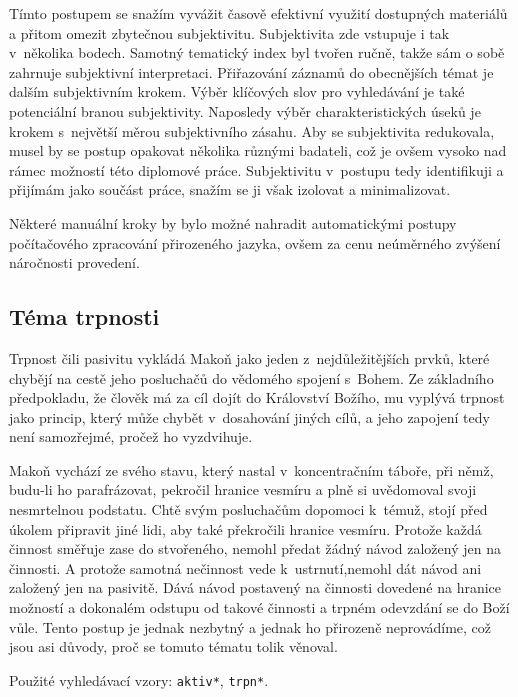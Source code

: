 Tímto postupem se snažím vyvážit časově efektivní využití dostupných materiálů a
přitom omezit zbytečnou subjektivitu. Subjektivita zde vstupuje i tak v~několika
bodech. Samotný tematický index byl tvořen ručně, takže sám o sobě zahrnuje
subjektivní interpretaci. Přiřazování záznamů do obecnějších témat je dalším
subjektivním krokem. Výběr klíčových slov pro vyhledávání je také potenciální
branou subjektivity. Naposledy výběr charakteristických úseků je krokem
s~největší měrou subjektivního zásahu. Aby se subjektivita redukovala, musel by
se postup opakovat několika různými badateli, což je ovšem vysoko nad rámec
možností této diplomové práce. Subjektivitu v~postupu tedy identifikuji a
přijímám jako součást práce, snažím se ji však izolovat a minimalizovat.

Některé manuální kroky by bylo možné nahradit automatickými postupy počítačového
zpracování přirozeného jazyka, ovšem za cenu neúměrného zvýšení náročnosti
provedení.

\subsection{Téma trpnosti}

Trpnost čili pasivitu vykládá Makoň jako jeden z~nejdůležitějších prvků, které
chybějí na cestě jeho posluchačů do vědomého spojení s~Bohem. Ze základního
předpokladu, že člověk má za cíl dojít do Království Božího, mu vyplývá trpnost
jako princip, který může chybět v~dosahování jiných cílů, a jeho zapojení tedy
není samozřejmé, pročež ho vyzdvihuje.

Makoň vychází ze svého stavu, který nastal v~koncentračním táboře, při němž,
budu-li ho parafrázovat, pekročil hranice vesmíru a plně si uvědomoval svoji
nesmrtelnou podstatu. Chtě svým posluchačům dopomoci k~témuž, stojí před
úkolem připravit jiné lidi, aby také překročili hranice vesmíru. Protože každá
činnost směřuje zase do stvořeného, nemohl předat žádný návod založený jen na
činnosti. A protože samotná nečinnost vede k~ustrnutí,nemohl dát návod ani
založený jen na pasivitě. Dává návod postavený na činnosti dovedené na hranice
možností a dokonalém odstupu od takové činnosti a trpném odevzdání se do Boží
vůle. Tento postup je jednak nezbytný a jednak ho přirozeně neprovádíme, což
jsou asi důvody, proč se tomuto tématu tolik věnoval.

Použité vyhledávací vzory: \texttt{aktiv*}, \texttt{trpn*}.


